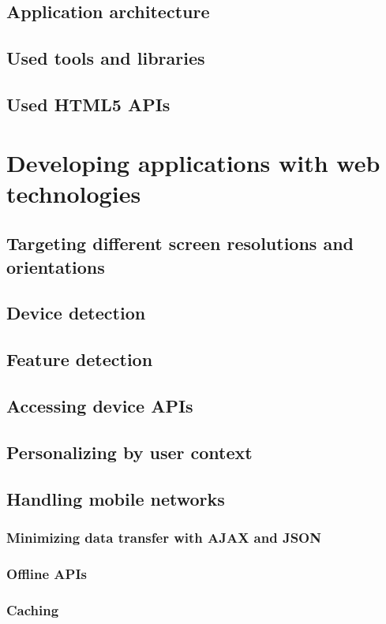 \documentclass[a4paper,12pt]{article}
\begin{document}
\subsection{Application architecture}
\subsection{Used tools and libraries}
\subsection{Used HTML5 APIs}

\section{Developing applications with web technologies}

\subsection{Targeting different screen resolutions and orientations}
\subsection{Device detection}
\subsection{Feature detection}
\subsection{Accessing device APIs}
\subsection{Personalizing by user context}

\subsection{Handling mobile networks}
\subsubsection{Minimizing data transfer with AJAX and JSON}
\subsubsection{Offline APIs}
\subsubsection{Caching}
\end{document}
